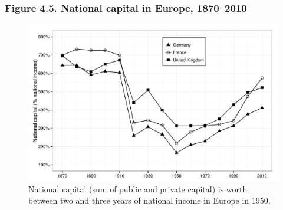 \documentclass[t]{beamer}\usepackage[]{graphicx}\usepackage[]{color}
\newenvironment{knitrout}{}{} %
\begin{document}
\begin{frame}[label=Figure_4_5]
\frametitle{Figure 4.5. National capital in Europe, 1870--2010}
\begin{figure}[t]
\begin{minipage}[b]{\textwidth}
\centering
\begin{knitrout}\footnotesize
{}\color{fgcolor}

{\centering \includegraphics[width=1\linewidth]{figures/bw/Figure_4_5} 

}



\end{knitrout}
\caption{National capital (sum of public and private capital) is worth between two and three years of national income in Europe in 1950.}
\end{minipage}
\end{figure}
\end{frame}
\end{document}
